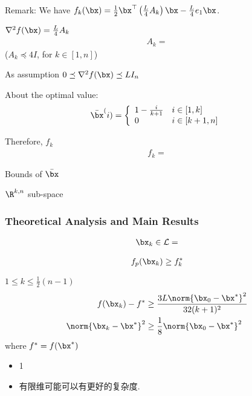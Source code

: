Remark: We have $f_k(\bx)=\frac{1}{2}\bx^\top\left( \frac{L}{4}A_k \right)\bx - \frac{L}{4}e_1\bx$. 

$\nabla^2f(\bx)=\frac{L}{4}A_k$
\begin{align*}
    A_k=
\end{align*}
($A_k \preceq 4I$, for $k\in[1,n]$)

As assumption
$0\preceq \nabla^2f(\bx) \preceq LI_n$

About the optimal value: 
\begin{align*}
    \bar{\bx}^(i)=\left\{ \begin{array}{ll}
        1-\frac{i}{k+1} & i\in[1,k]\\
        0 & i\in[k+1,n]
    \end{array} \right.
\end{align*}

Therefore, $f_k$
\begin{align*}
    f_k=
\end{align*}

Bounds of $\bar{\bx}$

$\R^{k,n}$ sub-space

\subsubsection{Theoretical Analysis and Main Results}
\begin{lemma}
    \begin{align*}
        \bx_k\in \mathcal{L} = 
    \end{align*}
\end{lemma}

\begin{corollary}
    \begin{align*}
        f_p(\bx_k)\ge f_k^*
    \end{align*}
\end{corollary}

\begin{theorem}
    $1\le k\le \frac{1}{2}(n-1)$
    \begin{align*}
        f(\bx_k)-f^*&\ge \frac{3L\norm{\bx_0-\bx^*}^2}{32(k+1)^2}\\
        \norm{\bx_k-\bx^*}^2&\ge\frac{1}{8}\norm{\bx_0-\bx^*}^2
    \end{align*}
    where $f^*=f(\bx^*)$
\end{theorem}

\begin{itemize}
    \item 1
    \item 有限维可能可以有更好的复杂度. 
\end{itemize}


